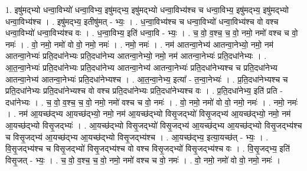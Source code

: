 \documentclass[17pt]{extarticle}
\begin{document}
1. इषु॑मद्भ्यो धन्वा॒विभ्यो॑ धन्वा॒विभ्य॒ इषु॑मद्भ्य॒ इषु॑मद्भ्यो धन्वा॒विभ्य॑श्च च धन्वा॒विभ्य॒ इषु॑मद्भ्य॒ इषु॑मद्भ्यो धन्वा॒विभ्य॑श्च । . इषु॑मद्भ्य॒ इतीषु॑मत् - भ्यः॒ । . ध॒न्वा॒विभ्य॑श्च च धन्वा॒विभ्यो॑ धन्वा॒विभ्य॑श्च वो वश्च धन्वा॒विभ्यो॑ धन्वा॒विभ्य॑श्च वः । . ध॒न्वा॒विभ्य॒ इति॑ धन्वा॒वि - भ्यः॒ । . च॒ वो॒ व॒श्च॒ च॒ वो॒ नमो॒ नमो॑ वश्च च वो॒ नमः॑ । . वो॒ नमो॒ नमो॑ वो वो॒ नमो॒ नमः॑ । . नमो॒ नमः॑ । . नम॑ आतन्वा॒नेभ्य॑ आतन्वा॒नेभ्यो॒ नमो॒ नम॑ आतन्वा॒नेभ्यः॑ प्रति॒दधा॑नेभ्यः प्रति॒दधा॑नेभ्य आतन्वा॒नेभ्यो॒ नमो॒ नम॑ आतन्वा॒नेभ्यः॑ प्रति॒दधा॑नेभ्यः । . आ॒त॒न्वा॒नेभ्यः॑ प्रति॒दधा॑नेभ्यः प्रति॒दधा॑नेभ्य आतन्वा॒नेभ्य॑ आतन्वा॒नेभ्यः॑ प्रति॒दधा॑नेभ्यश्च च प्रति॒दधा॑नेभ्य आतन्वा॒नेभ्य॑ आतन्वा॒नेभ्यः॑ प्रति॒दधा॑नेभ्यश्च । . आ॒त॒न्वा॒नेभ्य॒ इत्या᳚ - त॒न्वा॒नेभ्यः॑ । . प्र॒ति॒दधा॑नेभ्यश्च च प्रति॒दधा॑नेभ्यः प्रति॒दधा॑नेभ्यश्च वो वश्च प्रति॒दधा॑नेभ्यः प्रति॒दधा॑नेभ्यश्च वः । . प्र॒ति॒दधा॑नेभ्य॒ इति॑ प्रति - दधा॑नेभ्यः । . च॒ वो॒ व॒श्च॒ च॒ वो॒ नमो॒ नमो॑ वश्च च वो॒ नमः॑ । . वो॒ नमो॒ नमो॑ वो वो॒ नमो॒ नमः॑ । . नमो॒ नमः॑ । . नम॑ आ॒यच्छ॑द्भ्य आ॒यच्छ॑द्भ्यो॒ नमो॒ नम॑ आ॒यच्छ॑द्भ्यो विसृ॒जद्भ्यो॑ विसृ॒जद्भ्य॑ आ॒यच्छ॑द्भ्यो॒ नमो॒ नम॑ आ॒यच्छ॑द्भ्यो विसृ॒जद्भ्यः॑ । . आ॒यच्छ॑द्भ्यो विसृ॒जद्भ्यो॑ विसृ॒जद्भ्य॑ आ॒यच्छ॑द्भ्य आ॒यच्छ॑द्भ्यो विसृ॒जद्भ्य॑श्च च विसृ॒जद्भ्य॑ आ॒यच्छ॑द्भ्य आ॒यच्छ॑द्भ्यो विसृ॒जद्भ्य॑श्च । . आ॒यच्छ॑द्भ्य॒ इत्या॒यच्छ॑त् - भ्यः॒ । . वि॒सृ॒जद्भ्य॑श्च च विसृ॒जद्भ्यो॑ विसृ॒जद्भ्य॑श्च वो वश्च विसृ॒जद्भ्यो॑ विसृ॒जद्भ्य॑श्च वः । . वि॒सृ॒जद्भ्य॒ इति॑ विसृ॒जत् - भ्यः॒ । . च॒ वो॒ व॒श्च॒ च॒ वो॒ नमो॒ नमो॑ वश्च च वो॒ नमः॑ । . वो॒ नमो॒ नमो॑ वो वो॒ नमो॒ नमः॑ । \newline
\end{document}
